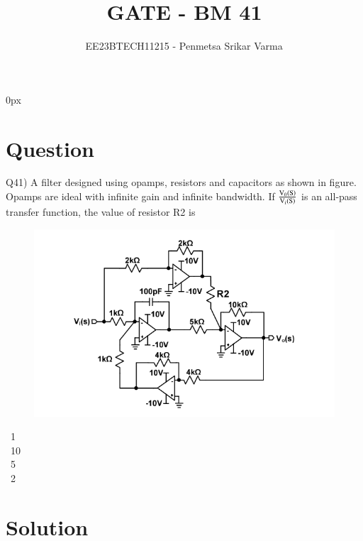 \documentclass[beamer]{IEEEtran}
\theoremstyle{remark}
\begin{document}
\parindent 0px


\title{GATE - BM 41}
\author{EE23BTECH11215 - Penmetsa Srikar Varma$^{}$%
}
\maketitle
\newpage
\bigskip

\renewcommand{\thefigure}{\theenumi}
\renewcommand{\thetable}{\theenumi}
\section*{Question}
Q41) A filter designed using opamps, resistors and capacitors as shown in figure.
Opamps are ideal with infinite gain and infinite bandwidth. If $\frac{\text{V}_0\left(\text{S}\right)}{\text{V}_\text{i}\left(\text{S}\right)}$ is an all-pass transfer function, the value of resistor R2  is\\
\begin{figure}[h]
    \centering
    \includegraphics[scale=0.44]{figs/bm,41.png}
    \label{bm,41}
\end{figure}
\begin{center}
\end{center}
\ 1\\
\ 10\\
\ 5\\ 
\ 2\ \qquad\qquad\qquad\quad\qquad\qquad\qquad\qquad{}
\section*{Solution}
\end{document}
